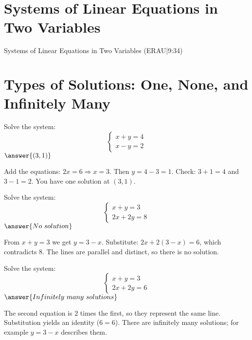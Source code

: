 \documentclass{ximera}
\begin{document}

\section*{Systems of Linear Equations in Two Variables}

Systems of Linear Equations in Two Variables (ERAU|9:34)



\section*{Types of Solutions: One, None, and Infinitely Many}

\begin{problem}
Solve the system:
\[
\begin{cases}
x + y = 4\\
x - y = 2
\end{cases}
\]
$\answer{(3,1)}$
\begin{feedback}
Add the equations: $2x = 6 \Rightarrow x = 3$. Then $y = 4 - 3 = 1$. Check: $3+1=4$ and $3-1=2$. You have one solution at $(3,1)$.
\end{feedback}
\end{problem}

\begin{problem}
Solve the system:
\[
\begin{cases}
x + y = 3\\
2x + 2y = 8
\end{cases}
\]
$\answer{No\ solution}$
\begin{feedback}
From $x+y=3$ we get $y=3-x$. Substitute: $2x+2(3-x)=6$, which contradicts $8$. The lines are parallel and distinct, so there is no solution.
\end{feedback}
\end{problem}

\begin{problem}
Solve the system:
\[
\begin{cases}
x + y = 3\\
2x + 2y = 6
\end{cases}
\]
$\answer{Infinitely\ many\ solutions}$
\begin{feedback}
The second equation is $2$ times the first, so they represent the same line. Substitution yields an identity ($6=6$). There are infinitely many solutions; for example $y=3-x$ describes them.
\end{feedback}
\end{problem}
\end{document}
